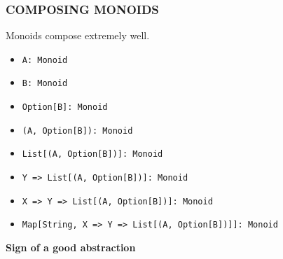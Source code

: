 \documentclass{beamer}
\begin{document}








\begin{frame} \frametitle{COMPOSING MONOIDS}
  Monoids compose extremely well.
  \begin{itemize}
    \item \texttt{A: Monoid}
    \item \texttt{B: Monoid}
      \pause
    \item \texttt{Option[B]: Monoid}
      \pause
    \item \texttt{(A, Option[B]): Monoid}
    \item \texttt{List[(A, Option[B])]: Monoid}
      \pause
    \item \texttt{Y => List[(A, Option[B])]: Monoid}
      \pause
    \item \texttt{X => Y => List[(A, Option[B])]: Monoid}
    \item \texttt{Map[String, X => Y => List[(A, Option[B])]]: Monoid}
  \end{itemize}
  \begin{block}{}
    \centering
    \Large \textbf{Sign of a good abstraction}
  \end{block}
\end{frame}
\end{document}
